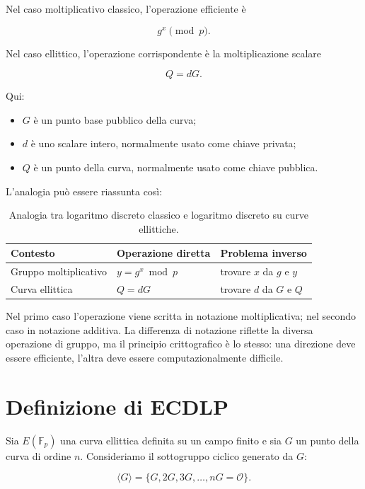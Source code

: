\documentclass[12pt,a4paper,oneside]{report}
\begin{document}
Nel caso moltiplicativo classico, l'operazione efficiente è

\[
g^x \pmod p.
\]

Nel caso ellittico, l'operazione corrispondente è la moltiplicazione scalare

\[
Q = dG.
\]

Qui:

\begin{itemize}
    \item \(G\) è un punto base pubblico della curva;
    \item \(d\) è uno scalare intero, normalmente usato come chiave privata;
    \item \(Q\) è un punto della curva, normalmente usato come chiave pubblica.
\end{itemize}

L'analogia può essere riassunta così:

\begin{table}[h]
\centering
\begin{tabular}{lll}
\toprule
\textbf{Contesto} & \textbf{Operazione diretta} & \textbf{Problema inverso} \\
\midrule
Gruppo moltiplicativo & \(y = g^x \bmod p\) & trovare \(x\) da \(g\) e \(y\) \\
Curva ellittica & \(Q = dG\) & trovare \(d\) da \(G\) e \(Q\) \\
\bottomrule
\end{tabular}
\caption{Analogia tra logaritmo discreto classico e logaritmo discreto su curve ellittiche.}
\label{tab:dlp-ecdlp-ch6}
\end{table}

Nel primo caso l'operazione viene scritta in notazione moltiplicativa; nel secondo caso in notazione additiva. La differenza di notazione riflette la diversa operazione di gruppo, ma il principio crittografico è lo stesso: una direzione deve essere efficiente, l'altra deve essere computazionalmente difficile.

\section{Definizione di ECDLP}

Sia \(E(\mathbb{F}_p)\) una curva ellittica definita su un campo finito e sia \(G\) un punto della curva di ordine \(n\). Consideriamo il sottogruppo ciclico generato da \(G\):

\begin{equation}
    \langle G \rangle = \{G,2G,3G,\ldots,nG=\mathcal{O}\}.
\end{equation}
\end{document}
